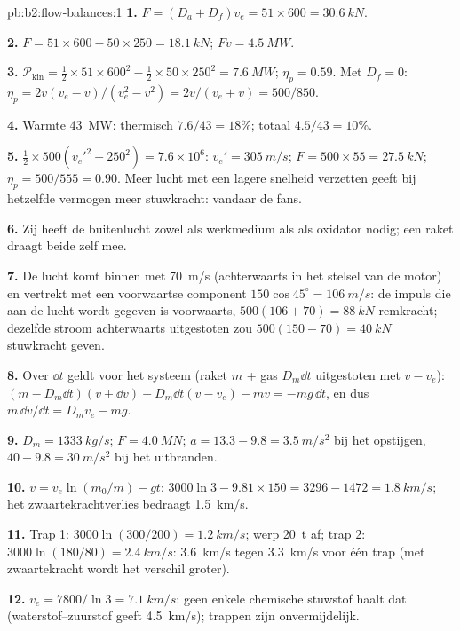 \begin{solution}{pb:b2:flow-balances:1}
\textbf{1.} $F = (D_a + D_f)v_e = 51 \times 600 = \qty{30.6}{kN}$.

\textbf{2.} $F = 51 \times 600 - 50 \times 250 = \qty{18.1}{kN}$;
$Fv = \qty{4.5}{MW}$.

\textbf{3.}
$\mathcal P_{\text{kin}} = \tfrac12 \times 51 \times 600^2 - \tfrac12 \times 50 \times 250^2 =
\qty{7.6}{MW}$;
$\eta_p = 0.59$. Met $D_f = 0$:
$\eta_p = 2v(v_e - v)/(v_e^2 - v^2)
= 2v/(v_e + v) = 500/850$.

\textbf{4.} Warmte \qty{43}{MW}: thermisch $7.6/43 = 18\%$; totaal $4.5/43 = 10\%$.

\textbf{5.} $\tfrac12 \times 500(v_e'^2 - 250^2) = 7.6 \times 10^6$:
$v_e' = \qty{305}{m/s}$; $F = 500 \times 55 = \qty{27.5}{kN}$;
$\eta_p = 500/555 = 0.90$. Meer lucht met een lagere snelheid verzetten
geeft bij hetzelfde vermogen meer stuwkracht: vandaar de fans.

\textbf{6.} Zij heeft de buitenlucht zowel als werkmedium als als oxidator
nodig; een raket draagt beide zelf mee.

\textbf{7.} De lucht komt binnen met \qty{70}{m/s} (achterwaarts in het
stelsel van de motor) en vertrekt met een voorwaartse component
$150\cos45^\circ = \qty{106}{m/s}$: de impuls die aan de lucht wordt gegeven
is voorwaarts, $500(106 + 70) = \qty{88}{kN}$ remkracht; dezelfde stroom
achterwaarts uitgestoten zou $500(150 - 70) =
\qty{40}{kN}$ stuwkracht
geven.

\textbf{8.} Over $\dd t$ geldt voor het systeem (raket $m$ + gas $D_m\dd t$
uitgestoten met $v - v_e$):
$(m - D_m\dd t)(v + \dd v) + D_m\dd t(v - v_e) - mv = -mg\,\dd t$, en dus
$m\,\dd v/\dd t = D_mv_e - mg$.

\textbf{9.} $D_m = \qty{1333}{kg/s}$; $F = \qty{4.0}{MN}$;
$a = 13.3 - 9.8 =
\qty{3.5}{m/s^2}$ bij het opstijgen,
$40 - 9.8 = \qty{30}{m/s^2}$ bij het uitbranden.

\textbf{10.} $v = v_e\ln(m_0/m) - gt$:
$3000\ln3 - 9.81 \times 150 = 3296 - 1472 =
\qty{1.8}{km/s}$; het
zwaartekrachtverlies bedraagt \qty{1.5}{km/s}.

\textbf{11.} Trap 1: $3000\ln(300/200) = \qty{1.2}{km/s}$; werp \qty{20}{t}
af; trap 2: $3000\ln(180/80) = \qty{2.4}{km/s}$: \qty{3.6}{km/s} tegen
\qty{3.3}{km/s} voor één trap (met zwaartekracht wordt het verschil groter).

\textbf{12.} $v_e = 7800/\ln3 = \qty{7.1}{km/s}$: geen enkele chemische
stuwstof haalt dat (waterstof--zuurstof geeft \qty{4.5}{km/s}); trappen zijn
onvermijdelijk.


\end{solution}
